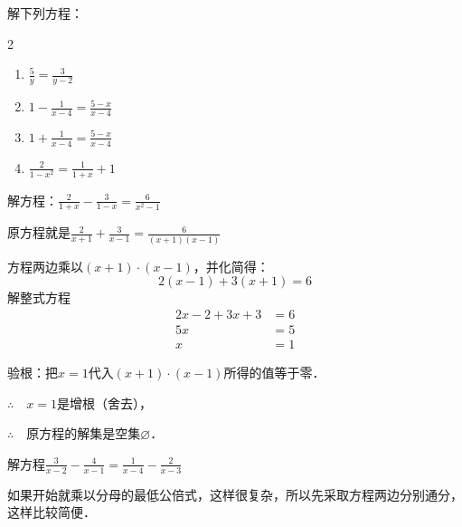 \begin{ex}
   解下列方程：
   \begin{multicols}{2}
       \begin{enumerate}
        \item $\frac{5}{y}=\frac{3}{y-2}$
        \item $1-\frac{1}{x-4}=\frac{5-x}{x-4}$
        \item $1+\frac{1}{x-4}=\frac{5-x}{x-4}$
        \item $\frac{2}{1-x^2}=\frac{1}{1+x}+1$
    \end{enumerate}
   \end{multicols}
   
\end{ex}

\begin{example}
    解方程：$\frac{2}{1+x}-\frac{3}{1-x}=\frac{6}{x^2-1}$
\end{example}

\begin{solution}
原方程就是$\frac{2}{x+1}+\frac{3}{x-1}=\frac{6}{(x+1)(x-1)}$

方程两边乘以$(x+1)\cdot (x-1)$，并化简得：
\[2(x-1)+3(x+1)=6\]
解整式方程
\[\begin{split}
    2x-2+3x+3&=6\\
    5x&=5\\
    x&=1
\end{split}\]
 
验根：把$x=1$代入$(x+1)\cdot (x-1)$所得的值等于零．

$\therefore\quad x=1$是增根（舍去），

$\therefore\quad$原方程的解集是空集$\varnothing$．
\end{solution}



\begin{example}
解方程$\frac{3}{x-2}-\frac{4}{x-1}=\frac{1}{x-4}-\frac{2}{x-3}$
\end{example}

\begin{analyze}
如果开始就乘以分母的最低公倍式，这样很复杂，所以先采取方程两边分别通分，这样比较简便．
\end{analyze}

